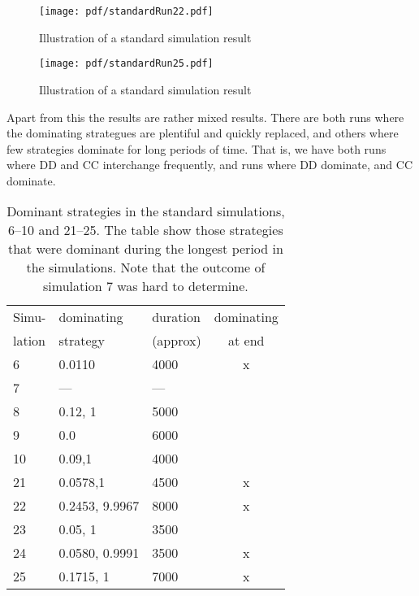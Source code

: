 \begin{figure}[htbp]
\centering
\texttt{[image: pdf/standardRun22.pdf]}
\caption{Illustration of a standard simulation result}
\label{fig:resulsts:example:2}
\end{figure}

\begin{figure}[htbp]
\centering
\texttt{[image: pdf/standardRun25.pdf]}
\caption{Illustration of a standard simulation result}
\label{fig:resulsts:example:3}
\end{figure}

Apart from this the results are rather mixed results. There are both runs where the dominating strategues are plentiful and quickly replaced, and others where few strategies dominate for long periods of time. That is, we have both runs where DD and CC interchange frequently, and runs where DD dominate, and CC dominate. \mypar


\begin{table}[!hbtp]
  \footnotesize
  \centering
  \label{tab:results:dominant:6}
  \caption{Dominant strategies in the standard simulations, 6--10 and
    21--25. The table show those strategies that were dominant during
    the longest period in the simulations. Note that the outcome of
    simulation 7 was hard to determine.}
  \begin{tabular}{lllc}
    Simu-  & dominating & duration  & dominating \\
    lation & strategy   & (approx)  & at end \\
    \hline
    6  & 0.0110         & 4000 & x \\          
    7  & ---            & --- &            \\
    8  & 0.12, 1        & 5000 &            \\ 
    9  & 0.0            & 6000 &            \\ 
    10 & 0.09,1         & 4000 &            \\ 
    21 & 0.0578,1       & 4500 & x \\          
    22 & 0.2453, 9.9967 & 8000 & x \\          
    23 & 0.05, 1        & 3500 &            \\ 
    24 & 0.0580, 0.9991 & 3500 & x \\          
    25 & 0.1715, 1      & 7000 & x \\          
    \hline
  \end{tabular}
\end{table}

